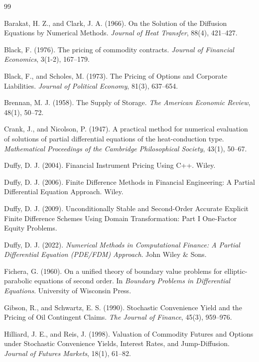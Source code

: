 \documentclass[12pt,a4paper]{article}
\begin{document}
\newpage
\begin{thebibliography}{99}

 Barakat, H. Z., and Clark, J. A. (1966). On the Solution of the Diffusion Equations by Numerical Methods. \textit{Journal of Heat Transfer}, 88(4), 421--427.

 Black, F. (1976). The pricing of commodity contracts. \textit{Journal of Financial Economics}, 3(1-2), 167--179.

 Black, F., and Scholes, M. (1973). The Pricing of Options and Corporate Liabilities. \textit{Journal of Political Economy}, 81(3), 637--654.

 Brennan, M. J. (1958). The Supply of Storage. \textit{The American Economic Review}, 48(1), 50--72.


 Crank, J., and Nicolson, P. (1947). A practical method for numerical evaluation of solutions of partial differential equations of the heat-conduction type. \textit{Mathematical Proceedings of the Cambridge Philosophical Society}, 43(1), 50--67.

 Duffy, D. J. (2004). Financial Instrument Pricing Using C++. Wiley.

 Duffy, D. J. (2006). Finite Difference Methods in Financial Engineering: A Partial Differential Equation Approach. Wiley.

 Duffy, D. J. (2009). Unconditionally Stable and Second-Order Accurate Explicit Finite Difference Schemes Using Domain Transformation: Part I One-Factor Equity Problems.

 Duffy, D. J. (2022). \textit{Numerical Methods in Computational Finance: A Partial Differential Equation (PDE/FDM) Approach}. John Wiley \& Sons.

 Fichera, G. (1960). On a unified theory of boundary value problems for elliptic-parabolic equations of second order. In \textit{Boundary Problems in Differential Equations}. University of Wisconsin Press.

 Gibson, R., and Schwartz, E. S. (1990). Stochastic Convenience Yield and the Pricing of Oil Contingent Claims. \textit{The Journal of Finance}, 45(3), 959--976.

 Hilliard, J. E., and Reis, J. (1998). Valuation of Commodity Futures and Options under Stochastic Convenience Yields, Interest Rates, and Jump-Diffusion. \textit{Journal of Futures Markets}, 18(1), 61--82.


\end{thebibliography}
\end{document}
